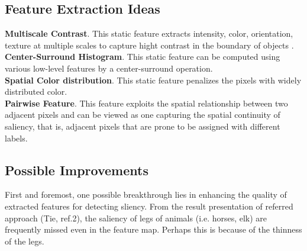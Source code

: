 \documentclass[12pt,a4paper]{article}
\newcommand{\htab}{\hspace*{0.63cm}}
\begin{document}
\begin{multicols}{2}
\subsection{Feature Extraction Ideas}
\textbf{Multiscale Contrast}. This static feature extracts intensity, color, orientation, texture at multiple scales to capture hight contrast in the boundary of objects . \\[0.1cm]
\textbf{Center-Surround Histogram}. This static feature can be computed using various low-level features by a center-surround operation.  \\[0.1cm]
\textbf{Spatial Color distribution}. This static feature penalizes the pixels with widely distributed color. \\[0.1cm]
\textbf{Pairwise Feature}. This feature exploits the spatial relationship between two adjacent pixels and can be viewed as one capturing the spatial continuity of saliency, that is, adjacent pixels that are prone to be assigned with different labels. 
\subsection{Possible Improvements}
\htab First and foremost, one possible breakthrough lies in enhancing the quality of extracted features for detecting sliency. From the result presentation of referred approach (Tie, ref.2), the saliency of legs of animals (i.e. horses, elk) are frequently missed even in the feature map. Perhaps this is because of the thinness of the legs.

\end{multicols}
\end{document}
